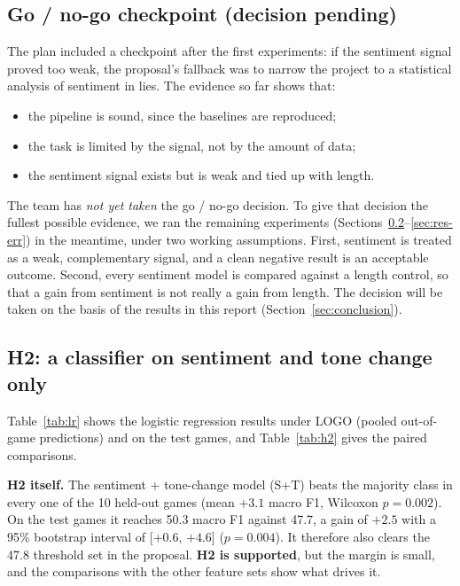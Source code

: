 \documentclass[conference]{IEEEtran}
\begin{document}
\subsection{Go / no-go checkpoint (decision pending)}
\label{sec:res-go}
The plan included a checkpoint after the first experiments: if the sentiment signal proved too weak, the proposal's fallback was to narrow the project to a statistical analysis of sentiment in lies. The evidence so far shows that:
\begin{itemize}
\item the pipeline is sound, since the baselines are reproduced;
\item the task is limited by the signal, not by the amount of data;
\item the sentiment signal exists but is weak and tied up with length.
\end{itemize}
The team has \emph{not yet taken} the go / no-go decision. To give that decision the fullest possible evidence, we ran the remaining experiments (Sections~\ref{sec:res-lr}--\ref{sec:res-err}) in the meantime, under two working assumptions. First, sentiment is treated as a weak, complementary signal, and a clean negative result is an acceptable outcome. Second, every sentiment model is compared against a length control, so that a gain from sentiment is not really a gain from length. The decision will be taken on the basis of the results in this report (Section~\ref{sec:conclusion}).

\subsection{H2: a classifier on sentiment and tone change only}
\label{sec:res-lr}
Table~\ref{tab:lr} shows the logistic regression results under LOGO (pooled out-of-game predictions) and on the test games, and Table~\ref{tab:h2} gives the paired comparisons.

\textbf{H2 itself.} The sentiment + tone-change model (S+T) beats the majority class in every one of the 10 held-out games (mean $+3.1$ macro F1, Wilcoxon $p = 0.002$). On the test games it reaches 50.3 macro F1 against 47.7, a gain of $+2.5$ with a 95\% bootstrap interval of [$+0.6$, $+4.6$] ($p = 0.004$). It therefore also clears the 47.8 threshold set in the proposal. \textbf{H2 is supported}, but the margin is small, and the comparisons with the other feature sets show what drives it.
\end{document}
